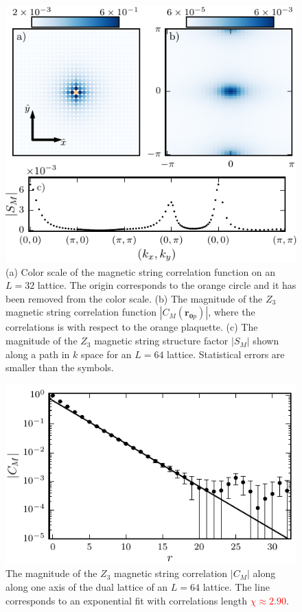 \documentclass[twocolumn,prb,aps,floatfix,superscriptaddress]{revtex4-1}
\newcommand{\note}[1]{\textcolor{red}{#1}}
\begin{document}
    \begin{figure}[t]
        \centering
        \includegraphics[width=1.0\columnwidth]{vison_3way.pdf}
        \caption
        {
            (a) Color scale of the magnetic string correlation function 
            on an $L=32$ lattice. The origin corresponds to the orange circle and it has been removed from
            the color scale.
            (b) The magnitude of the $Z_3$ magnetic string correlation function
            $|C_M(\bm{r}_{\bm{0}p})|$, where the correlations is with respect to the orange plaquette.
            (c) The magnitude of the $Z_3$ magnetic string structure factor $|S_M|$ shown along a
            path in $k$ space for an $L=64$ lattice. Statistical errors are smaller than the symbols.
        }
        \label{fig:vison_3way}
    \end{figure}

\begin{figure}
    \centering
    \includegraphics[width=1.0\columnwidth]{spatial_cors_z3_vis.pdf}
    \caption{ The magnitude of the $Z_3$ magnetic string correlation $|C_M|$ along along one axis of the dual lattice of an $L=64$ lattice. The line corresponds to an exponential fit with correlations length \note{$\chi\approx 2.90$}.}
    \label{fig:vison_cor}
\end{figure}
\end{document}
